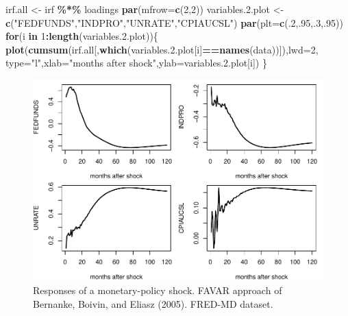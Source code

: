 \documentclass[
  12pt,
]{book}
\newenvironment{Shaded}{\begin{snugshade}}{\end{snugshade}}
\newcommand{\AttributeTok}[1]{\textcolor[rgb]{0.13,0.29,0.53}{#1}}
\newcommand{\ControlFlowTok}[1]{\textcolor[rgb]{0.13,0.29,0.53}{\textbf{#1}}}
\newcommand{\DecValTok}[1]{\textcolor[rgb]{0.00,0.00,0.81}{#1}}
\newcommand{\FloatTok}[1]{\textcolor[rgb]{0.00,0.00,0.81}{#1}}
\newcommand{\FunctionTok}[1]{\textcolor[rgb]{0.13,0.29,0.53}{\textbf{#1}}}
\newcommand{\NormalTok}[1]{#1}
\newcommand{\OtherTok}[1]{\textcolor[rgb]{0.56,0.35,0.01}{#1}}
\newcommand{\SpecialCharTok}[1]{\textcolor[rgb]{0.81,0.36,0.00}{\textbf{#1}}}
\newcommand{\StringTok}[1]{\textcolor[rgb]{0.31,0.60,0.02}{#1}}
\theoremstyle{definition}
\theoremstyle{definition}
\theoremstyle{definition}
\theoremstyle{definition}
\theoremstyle{remark}
\begin{document}
\begin{Shaded}
\begin{Highlighting}[]
\NormalTok{irf.all }\OtherTok{\textless{}{-}}\NormalTok{ irf }\SpecialCharTok{\%*\%}\NormalTok{ loadings}
\FunctionTok{par}\NormalTok{(}\AttributeTok{mfrow=}\FunctionTok{c}\NormalTok{(}\DecValTok{2}\NormalTok{,}\DecValTok{2}\NormalTok{))}
\NormalTok{variables.}\FloatTok{2.}\NormalTok{plot }\OtherTok{\textless{}{-}} \FunctionTok{c}\NormalTok{(}\StringTok{"FEDFUNDS"}\NormalTok{,}\StringTok{"INDPRO"}\NormalTok{,}\StringTok{"UNRATE"}\NormalTok{,}\StringTok{"CPIAUCSL"}\NormalTok{)}
\FunctionTok{par}\NormalTok{(}\AttributeTok{plt=}\FunctionTok{c}\NormalTok{(.}\DecValTok{2}\NormalTok{,.}\DecValTok{95}\NormalTok{,.}\DecValTok{3}\NormalTok{,.}\DecValTok{95}\NormalTok{))}
\ControlFlowTok{for}\NormalTok{(i }\ControlFlowTok{in} \DecValTok{1}\SpecialCharTok{:}\FunctionTok{length}\NormalTok{(variables.}\FloatTok{2.}\NormalTok{plot))\{}
  \FunctionTok{plot}\NormalTok{(}\FunctionTok{cumsum}\NormalTok{(irf.all[,}\FunctionTok{which}\NormalTok{(variables.}\FloatTok{2.}\NormalTok{plot[i]}\SpecialCharTok{==}\FunctionTok{names}\NormalTok{(data))]),}\AttributeTok{lwd=}\DecValTok{2}\NormalTok{,}
       \AttributeTok{type=}\StringTok{"l"}\NormalTok{,}\AttributeTok{xlab=}\StringTok{"months after shock"}\NormalTok{,}\AttributeTok{ylab=}\NormalTok{variables.}\FloatTok{2.}\NormalTok{plot[i])}
\NormalTok{\}}
\end{Highlighting}
\end{Shaded}

\begin{figure}
\includegraphics[width=0.95\linewidth]{IdentifStructShocks_files/figure-latex/FAVAR-1} \caption{Responses of a monetary-policy shock. FAVAR approach of Bernanke, Boivin, and Eliasz (2005). FRED-MD dataset.}\label{fig:FAVAR}
\end{figure}
\end{document}
